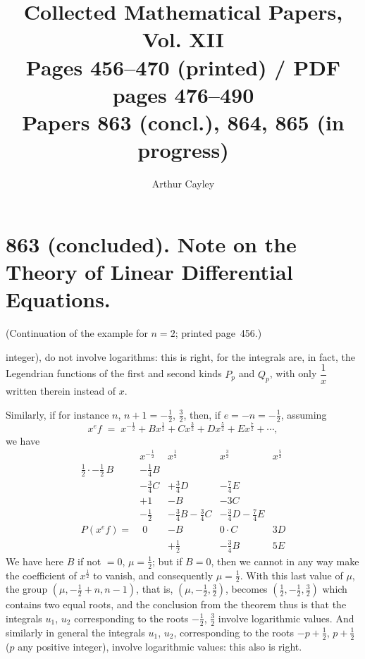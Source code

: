 \documentclass[11pt]{article}
\title{Collected Mathematical Papers, Vol. XII\\ \large Pages 456--470 (printed) / PDF pages 476--490\\ Papers 863 (concl.), 864, 865 (in progress)}
\author{Arthur Cayley}
\date{}
\begin{document}
\maketitle

\section*{863 (concluded). Note on the Theory of Linear Differential Equations.}

\noindent (Continuation of the example for $n = 2$; printed page~456.)

\medskip

\noindent integer), do not involve logarithms: this is right, for the integrals are, in fact, the Legendrian functions of the first and second kinds $P_{p}$ and $Q_{p}$, with only $\dfrac{1}{x}$ written therein instead of $x$.

Similarly, if for instance $n$, $n + 1 = -\tfrac{1}{2}$, $\tfrac{3}{2}$, then, if $e = -n = -\tfrac{1}{2}$, assuming
\[
x^{e}f \;=\; x^{-\frac{1}{2}} + Bx^{\frac{1}{2}} + Cx^{\frac{3}{2}} + Dx^{\frac{5}{2}} + Ex^{\frac{7}{2}} + \cdots,
\]
we have
\[
\renewcommand{\arraystretch}{1.15}
\begin{array}{r|cccc}
 & x^{-\frac{1}{2}} & x^{\frac{1}{2}} & x^{\frac{3}{2}} & x^{\frac{5}{2}} \\ \hline
\tfrac{1}{2}\cdot-\tfrac{1}{2}\,B & -\tfrac{1}{4}B & & & \\
                                  & -\tfrac{3}{4}C & +\tfrac{3}{4}D & -\tfrac{7}{4}E & \\
                                  & +1            & -B            & -3C            & \\
                                  & -\tfrac{1}{2} & -\tfrac{3}{4}B-\tfrac{3}{4}C & -\tfrac{3}{4}D-\tfrac{7}{4}E & \\
P(x^{e}f) = & \; 0 & -B & 0\cdot C & 3D \\
            &     & +\tfrac{1}{2} & -\tfrac{3}{4}B & 5E
\end{array}
\]
We have here $B$ if not $=0$, $\mu = \tfrac{1}{2}$; but if $B = 0$, then we cannot in any way make the coefficient of $x^{\frac{1}{2}}$ to vanish, and consequently $\mu = \tfrac{1}{2}$. With this last value of $\mu$, the group $(\mu, -\tfrac{1}{2}+n, n-1)$, that is, $(\mu, -\tfrac{1}{2}, \tfrac{3}{2})$, becomes $(\tfrac{1}{2}, -\tfrac{1}{2}, \tfrac{3}{2})$ which contains two equal roots, and the conclusion from the theorem thus is that the integrals $u_{1}$, $u_{2}$ corresponding to the roots $-\tfrac{1}{2}$, $\tfrac{3}{2}$ involve logarithmic values. And similarly in general the integrals $u_{1}$, $u_{2}$, corresponding to the roots $-p + \tfrac{1}{2}$, $p + \tfrac{1}{2}$ ($p$ any positive integer), involve logarithmic values: this also is right.
\end{document}
